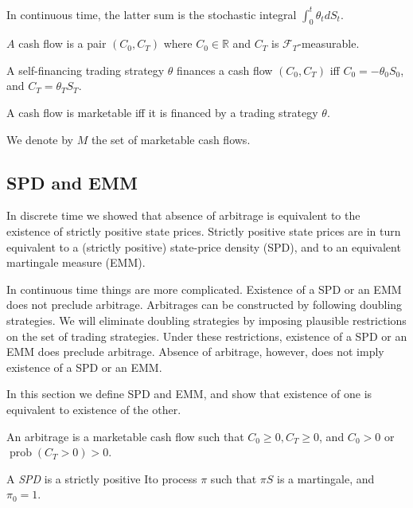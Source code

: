 \documentclass[\topdir/lecture\_notes.tex]{subfiles}
\begin{document}
In continuous time, the latter sum is the stochastic integral $\int_{0}^{t} \theta_{t} d S_{t}$.

\begin{defn}\label{def:cash_flow}
$A$ cash flow is a pair $\left(C_{0}, C_{T}\right)$ where $C_{0} \in \mathbb{R}$ and $C_{T}$ is $\mathcal{F}_{T}$-measurable.
\end{defn}

\begin{defn}\label{def:finances_cash_flow}
A self-financing trading strategy $\theta$ finances a cash flow $\left(C_{0}, C_{T}\right)$ iff $C_{0}=-\theta_{0} S_{0}$, and $C_{T}=\theta_{T} S_{T}$.
\end{defn}

\begin{defn}\label{def:marketable_cash_flow}
A cash flow is marketable iff it is financed by a trading strategy $\theta$.
\end{defn}

We denote by $M$ the set of marketable cash flows.

\subsection{SPD and EMM}
In discrete time we showed that absence of arbitrage is equivalent to the existence of strictly positive state prices. Strictly positive state prices are in turn equivalent to a (strictly positive) state-price density (SPD), and to an equivalent martingale measure (EMM).

In continuous time things are more complicated. Existence of a SPD or an EMM does not preclude arbitrage. Arbitrages can be constructed by following doubling strategies. We will eliminate doubling strategies by imposing plausible restrictions on the set of trading strategies. Under these restrictions, existence of a SPD or an EMM does preclude arbitrage. Absence of arbitrage, however, does not imply existence of a SPD or an EMM.

In this section we define SPD and EMM, and show that existence of one is equivalent to existence of the other.

\begin{defn}\label{def:arbitrage_continuous}
An arbitrage is a marketable cash flow such that $C_{0} \geq 0, C_{T} \geq 0$, and $C_{0}>0$ or $\operatorname{prob}\left(C_{T}>0\right)>0$.
\end{defn}

\begin{defn}\label{def:spd}
A \emph{SPD} is a strictly positive Ito process $\pi$ such that $\pi S$ is a martingale, and $\pi_{0}=1$.
\end{defn}
\end{document}
